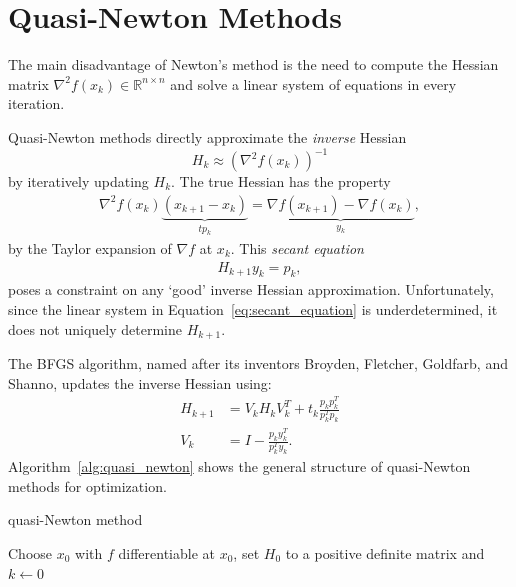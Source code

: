 \documentclass{article}
\begin{document}
\section{Quasi-Newton Methods}

The main disadvantage of Newton's method
is the need to compute
the Hessian matrix $\nabla^2 f(x_k) \in \mathbb{R}^{n \times n}$
and solve a linear system of equations
in every iteration.

Quasi-Newton methods directly approximate the
\emph{inverse} Hessian
$$H_k \approx (\nabla^2 f(x_k))^{-1}$$
by iteratively updating $H_k$.
The true Hessian has the property
\begin{align*}
    \nabla^2 f(x_{k}) \underbrace{
        (x_{k + 1} - x_k)
    }_{t p_k} =
    \underbrace{
        \nabla f(x_{k + 1}) - \nabla f(x_k)
    }_{y_k},
\end{align*}
by the Taylor expansion of $\nabla f$ at $x_k$.
This \emph{secant equation}
\begin{align}
    H_{k + 1} y_k = p_k,
    \label{eq:secant_equation}
\end{align}
poses a constraint on any `good' inverse Hessian approximation.
Unfortunately, since the linear system in Equation~\eqref{eq:secant_equation}
is underdetermined,
it does not uniquely determine $H_{k + 1}$.

The BFGS algorithm, named after its inventors
Broyden, Fletcher, Goldfarb, and Shanno,
updates the inverse Hessian using:
\begin{align*}
    H_{k + 1} & = V_k H_k V_k^T + t_k \frac{
        p_k p_k^T
    }{p_k^T p_k}                                   \\
    V_k       & = I - \frac{p_k y_k^T}{p_k^T y_k}.
\end{align*}
Algorithm~\ref{alg:quasi_newton} shows the general structure of
quasi-Newton methods for optimization.

\begin{algorithm}[htbp]
    \caption{quasi-Newton method}
    \SetAlgoLined
    Choose $x_0$ with $f$ differentiable at $x_0$, set $H_0$ to a
    positive definite matrix and $k \gets 0$ \\
    \label{alg:quasi_newton}
\end{algorithm}
\end{document}
